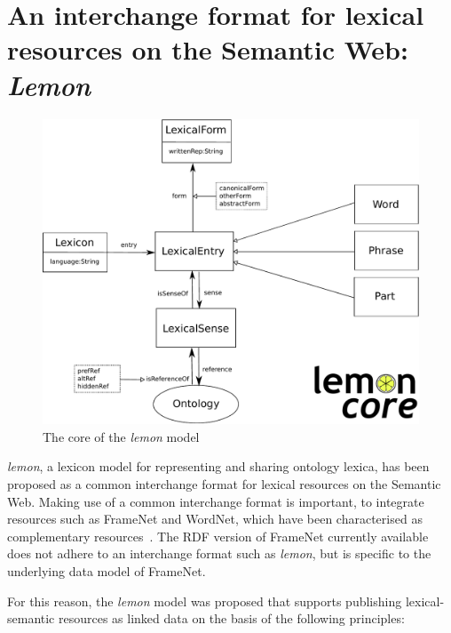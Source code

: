 \section{An interchange format for lexical resources on the Semantic Web: \emph{Lemon}}

\begin{figure}
 \begin{center}

 	 \includegraphics[width=1.0\columnwidth]{images/lemon-core}

 \end{center}
\caption{The core of the \emph{lemon} model\label{lemon-core}}
\end{figure}

\emph{lemon}, a lexicon model for representing and sharing ontology lexica, 
has been proposed as a common interchange format for lexical resources on the Semantic Web\cite{mccrae2012interchanging}. 
Making use of a common interchange format
is important, to integrate resources such as FrameNet and WordNet, which have
been characterised as
complementary resources~\cite{baker2009wordnet}. The RDF version of FrameNet currently available does not adhere to an interchange format such as \emph{lemon}, but is specific to the underlying data model of FrameNet.

For this reason, the \emph{lemon} model\cite{mccrae2012interchanging} was proposed  that supports publishing 
lexical-semantic resources as linked data on the basis of the following principles:

